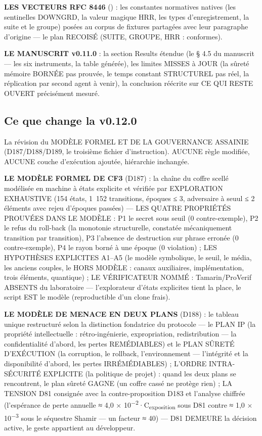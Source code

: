 \textbf{LES VECTEURS RFC 8446} () : les
constantes normatives natives (les sentinelles DOWNGRD, la valeur
magique HRR, les types d'enregistrement, la suite et le groupe) posées
au corpus de fixtures partagées avec leur paragraphe d'origine — le
plan RECOISÉ (SUITE, GROUPE, HRR : conformes).

\textbf{LE MANUSCRIT v0.11.0} : la section Results étendue (le § 4.5 du
manuscrit — les six instruments, la table générée), les limites MISSES à
JOUR (la sûreté mémoire BORNÉE pas prouvée, le temps constant
STRUCTUREL pas réel, la réplication par second agent à venir), la
conclusion réécrite sur CE QUI RESTE OUVERT précisément mesuré.

\subsection{Ce que change la v0.12.0}\label{sec:nouveautes120}

La révision du MODÈLE FORMEL ET DE LA GOUVERNANCE ASSAINIE (D187/D188/D189,
le troisième fichier d'instruction). AUCUNE règle modifiée, AUCUNE couche
d'exécution ajoutée, hiérarchie inchangée.

\textbf{LE MODÈLE FORMEL DE CF3} (D187) : la chaîne du coffre scellé
modélisée en machine à états explicite et vérifiée par EXPLORATION
EXHAUSTIVE (154 états, 1~152 transitions, époques ≤ 3, adversaire à seuul
≤ 2 éléments avec rejeu d'époques passées) — LES QUATRE PROPRIÉTÉS
PROUVÉES DANS LE MODÈLE : P1 le secret sous seuil (0 contre-exemple),
P2 le refus du roll-back (la monotonie structurelle, constatée
mécaniquement transition par transition), P3 l'absence de destruction sur
phrase erronée (0 contre-exemple), P4 le rayon borné à une époque (0
violation) ; LES HYPOTHÈSES EXPLICITES A1--A5 (le modèle symbolique, le
seuil, le média, les anciens couples, le HORS MODÈLE : canaux
auxiliaires, implémentation, trois éléments, quantique) ; LE
VÉRIFICATEUR NOMMÉ : Tamarin/ProVerif ABSENTS du laboratoire —
l'explorateur d'états explicites tient la place, le script EST le modèle
(reproductible d'un clone frais).

\textbf{LE MODÈLE DE MENACE EN DEUX PLANS} (D188) : le tableau unique
restructuré selon la distinction fondatrice du protocole — le PLAN IP
(la propriété intellectuelle : rétro-ingénierie, expropriation,
redistribution — la confidentialité d'abord, les pertes REMÉDIABLES) et
le PLAN SÛRETÉ D'EXÉCUTION (la corruption, le rollback, l'environnement
— l'intégrité et la disponibilité d'abord, les pertes IRRÉMÉDIABLES) ;
L'ORDRE INTRA-SÉCURITÉ EXPLICITE (la politique de projet) : quand les
deux plans se rencontrent, le plan sûreté GAGNE (un coffre cassé ne
protège rien) ; LA TENSION D81 consignée avec la contre-proposition D183
et l'analyse chiffrée (l'espérance de perte annuelle ≈ 4,0 ×
10\textsuperscript{−2}·C\textsubscript{exposition} sous D81 contre ≈ 1,0
× 10\textsuperscript{−3} sous le séquestre Shamir — un facteur ≈ 40) —
D81 DEMEURE la décision active, le geste appartient au développeur.

